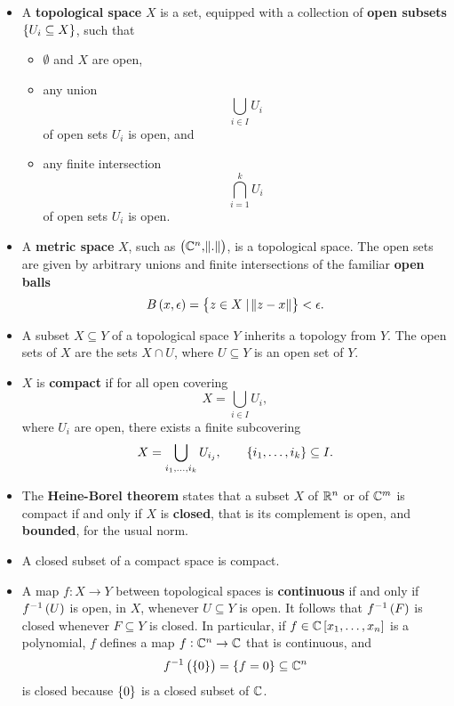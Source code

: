 \begin{remark}
\label{rem:2.19}
\hfill
\begin{itemize}
\item A \textbf{topological space} $ X $ is a set, equipped with a collection of \textbf{open subsets} $ \cbr{U_i \subseteq X} $, such that
\begin{itemize}
\item $ \emptyset $ and $ X $ are open,
\item any union
$$ \bigcup_{i \in I} U_i $$
of open sets $ U_i $ is open, and
\item any finite intersection
$$ \bigcap_{i = 1}^k U_i $$
of open sets $ U_i $ is open.
\end{itemize}
\item A \textbf{metric space} $ X $, such as $ \br{\C^n, \norm{.}} $, is a topological space. The open sets are given by arbitrary unions and finite intersections of the familiar \textbf{open balls}
$$ B\br{x, \epsilon} = \cbr{z \in X \mid \norm{z - x}} < \epsilon. $$
\item A subset $ X \subseteq Y $ of a topological space $ Y $ inherits a topology from $ Y $. The open sets of $ X $ are the sets $ X \cap U $, where $ U \subseteq Y $ is an open set of $ Y $.
\item $ X $ is \textbf{compact} if for all open covering
$$ X = \bigcup_{i \in I} U_i, $$
where $ U_i $ are open, there exists a finite subcovering
$$ X = \bigcup_{i_1, \dots, i_k} U_{i_j}, \qquad \cbr{i_1, \dots, i_k} \subseteq I. $$
\item The \textbf{Heine-Borel theorem} states that a subset $ X $ of $ \mathbb{R}^n $ or of $ \mathbb{C}^m $ is compact if and only if $ X $ is \textbf{closed}, that is its complement is open, and \textbf{bounded}, for the usual norm.
\item A closed subset of a compact space is compact.
\item A map $ f : X \to Y $ between topological spaces is \textbf{continuous} if and only if $ f^{-1}\br{U} $ is open, in $ X $, whenever $ U \subseteq Y $ is open. It follows that $ f^{-1}\br{F} $ is closed whenever $ F \subseteq Y $ is closed. In particular, if $ f \in \C\sbr{x_1, \dots, x_n} $ is a polynomial, $ f $ defines a map $ f : \mathbb{C}^n \to \mathbb{C} $ that is continuous, and
$$ f^{-1}\br{\cbr{0}} = \cbr{f = 0} \subseteq \C^n $$
is closed because $ \cbr{0} $ is a closed subset of $ \mathbb{C} $.
\end{itemize}
\end{remark}

